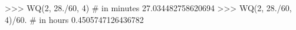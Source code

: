 
>>> WQ(2, 28./60, 4) # in minutes
27.034482758620694
>>> WQ(2, 28./60, 4)/60. # in hours
0.4505747126436782

